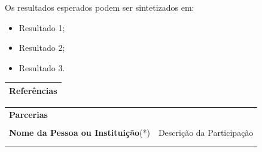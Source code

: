 \documentclass[
  12pt,				
  openright,	
  twoside,	
  a4paper,
  brazil,	
  oldfontcommands,
  ]{abntex2}
\begin{document}
Os resultados esperados podem ser sintetizados em:

\begin{itemize}[noitemsep]

\item Resultado 1;

\item Resultado 2;

\item Resultado 3.

\end{itemize}


\begin{table}[H]
\begin{center}
\begin{tabularx}{\textwidth}{|X|}
\hline
{\bf Refer\^{e}ncias} \\\hline
\end{tabularx}
\end{center}
\end{table}
\vspace{-10mm}

%

\begingroup
\renewcommand{\section}[2]{}%
\renewcommand{\chapter}[2]{}%


\endgroup

\begin{table}[H]
\begin{center}
\begin{tabularx}{\textwidth}{|X|X|}
\multicolumn{2}{l}{\noindent \textbf{Parcerias}}\\
\multicolumn{2}{l}{\noindent {\footnotesize Adicionar quantas linhas for necess\'{a}rio. (n\~{a}o obrigat\'{o}rio)}}\\
\hline
\cellcolor{green} {\bf Nome da Pessoa ou Institui\c{c}\~{a}o}(*) & \cellcolor{green} Descri\c{c}\~{a}o da Participa\c{c}\~{a}o \\\hline
 &  \\\hline
\multicolumn{2}{l}{\noindent {\footnotesize (*) Verificar a necessidade de ser firmado conv\^{e}nio para execu\c{c}\~{a}o do projeto.}}\\
\end{tabularx}
\end{center}
\end{table}
\vspace{-10mm}
\end{document}
